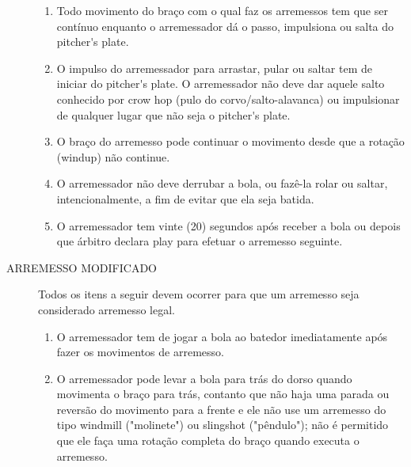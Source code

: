 \begin{description}
\begin{enumerate}[label=(\alph*)]
		\item Todo movimento do braço com o qual faz os arremessos tem que ser  contínuo enquanto o arremessador dá o passo, impulsiona ou salta do  \gls{pitcher's plate}.
		\item   O impulso do arremessador para arrastar, pular ou saltar tem de iniciar do \gls{pitcher's plate}. O arremessador não deve dar aquele salto conhecido por \gls{crow hop} (pulo do corvo/salto-alavanca) ou impulsionar de qualquer lugar que não seja o \gls{pitcher's plate}.
		\item O braço do arremesso pode continuar o movimento desde que a rotação (\gls{windup}) não continue.
		\item   O arremessador não deve derrubar a bola, ou fazê-la rolar ou saltar, intencionalmente, a fim de evitar que ela seja batida.
		\item  O arremessador tem vinte (20) segundos após receber a bola ou depois que	 árbitro declara \gls{play} para efetuar o arremesso seguinte.



	\end{enumerate}
	\item[ARREMESSO MODIFICADO] Todos os itens a seguir devem ocorrer para que um arremesso seja considerado arremesso legal.

	\begin{enumerate}[label=(\alph*)]
		\item  O arremessador tem de jogar a bola ao batedor imediatamente após fazer os movimentos de arremesso.
		\item  O arremessador pode levar a bola para trás do dorso quando movimenta o braço para trás, contanto que não haja uma parada ou reversão do movimento para a frente e ele não use um arremesso do tipo \gls{windmill} ("molinete") ou \gls{slingshot} ("pêndulo"); não é permitido que ele faça uma rotação completa do braço quando executa o arremesso.


\end{enumerate}
\end{description}
